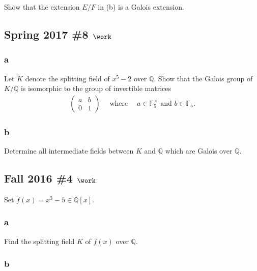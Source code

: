Show that the extension \(E/F\) in (b) is a Galois extension.

\hypertarget{spring-2017-8-work}{%
\subsection{\texorpdfstring{Spring 2017 \#8
\(\work\)}{Spring 2017 \#8 \textbackslash work}}\label{spring-2017-8-work}}

\hypertarget{a-67}{%
\subsubsection{a}\label{a-67}}

Let \(K\) denote the splitting field of \(x^5 - 2\) over
\({\mathbb{Q}}\). Show that the Galois group of \(K/{\mathbb{Q}}\) is
isomorphic to the group of invertible matrices
\begin{align*}
\left(\begin{array}{ll}
a & b \\
0 & 1
\end{array}\right) 
{\quad \operatorname{where} \quad} a\in {\mathbb{F}}_5^{\times}\text{ and } b\in {\mathbb{F}}_5
.\end{align*}

\hypertarget{b-57}{%
\subsubsection{b}\label{b-57}}

Determine all intermediate fields between \(K\) and \({\mathbb{Q}}\)
which are Galois over \({\mathbb{Q}}\).

\hypertarget{fall-2016-4-work}{%
\subsection{\texorpdfstring{Fall 2016 \#4
\(\work\)}{Fall 2016 \#4 \textbackslash work}}\label{fall-2016-4-work}}

Set \(f(x) = x^3 - 5 \in {\mathbb{Q}}[x]\).

\hypertarget{a-68}{%
\subsubsection{a}\label{a-68}}

Find the splitting field \(K\) of \(f(x)\) over \({\mathbb{Q}}\).

\hypertarget{b-58}{%
\subsubsection{b}\label{b-58}}

